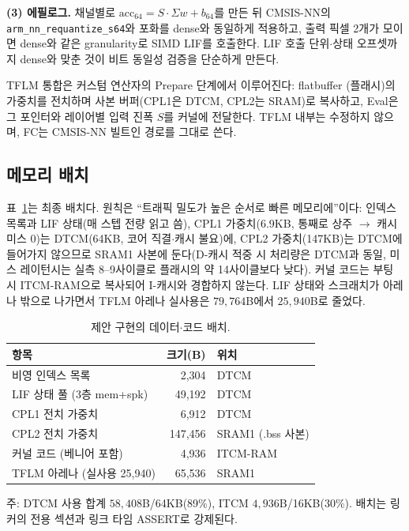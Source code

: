 \textbf{(3) 에필로그.} 채널별로 $\mathrm{acc}_{64} = S\cdot\Sigma w +
b_{64}$를 만든 뒤 CMSIS-NN의 \texttt{arm\_nn\_requantize\_s64}와
포화를 dense와 동일하게 적용하고, 출력 픽셀 2개가 모이면 dense와
같은 granularity로 SIMD LIF를 호출한다. LIF 호출 단위$\cdot$상태
오프셋까지 dense와 맞춘 것이 비트 동일성 검증을 단순하게 만든다.

TFLM 통합은 커스텀 연산자의 Prepare 단계에서 이루어진다: flatbuffer
(플래시)의 가중치를 전치하며 사본 버퍼(CPL1은 DTCM, CPL2는 SRAM)로
복사하고, Eval은 그 포인터와 레이어별 입력 진폭 $S$를 커널에
전달한다. TFLM 내부는 수정하지 않으며, FC는 CMSIS-NN 빌트인 경로를
그대로 쓴다.

\subsection{메모리 배치}\label{sec:placement}

표~\ref{tab:placement}는 최종 배치다. 원칙은 ``트래픽 밀도가 높은
순서로 빠른 메모리에''이다: 인덱스 목록과 LIF 상태(매 스텝 전량
읽고 씀), CPL1 가중치(6.9KB, 통째로 상주 $\rightarrow$ 캐시 미스 0)는
DTCM(64KB, 코어 직결$\cdot$캐시 불요)에, CPL2 가중치(147KB)는 DTCM에
들어가지 않으므로 SRAM1 사본에 둔다(D-캐시 적중 시 처리량은 DTCM과
동일, 미스 레이턴시는 실측 8--9사이클로 플래시의 약 14사이클보다
낮다). 커널 코드는 부팅 시
ITCM-RAM으로 복사되어 I-캐시와 경합하지 않는다. LIF 상태와
스크래치가 아레나 밖으로 나가면서 TFLM 아레나 실사용은
$79{,}764$B에서 $25{,}940$B로 줄었다.

\begin{table}[htbp]
\centering
\caption{제안 구현의 데이터$\cdot$코드 배치.}
\label{tab:placement}
\footnotesize
\setlength{\tabcolsep}{4pt}
\begin{tabular}{l r l}
\hline
항목 & 크기(B) & 위치 \\
\hline
비영 인덱스 목록 & 2,304 & DTCM \\
LIF 상태 풀 (3층 mem+spk) & 49,192 & DTCM \\
CPL1 전치 가중치 & 6,912 & DTCM \\
CPL2 전치 가중치 & 147,456 & SRAM1 (.bss 사본) \\
커널 코드 (베니어 포함) & 4,936 & ITCM-RAM \\
TFLM 아레나 (실사용 25,940) & 65,536 & SRAM1 \\
\hline
\end{tabular}
\begin{flushleft}
\footnotesize 주: DTCM 사용 합계 $58{,}408$B/64KB(89\%), ITCM
$4{,}936$B/16KB(30\%). 배치는 링커의 전용 섹션과 링크 타임
ASSERT로 강제된다.
\end{flushleft}
\end{table}

